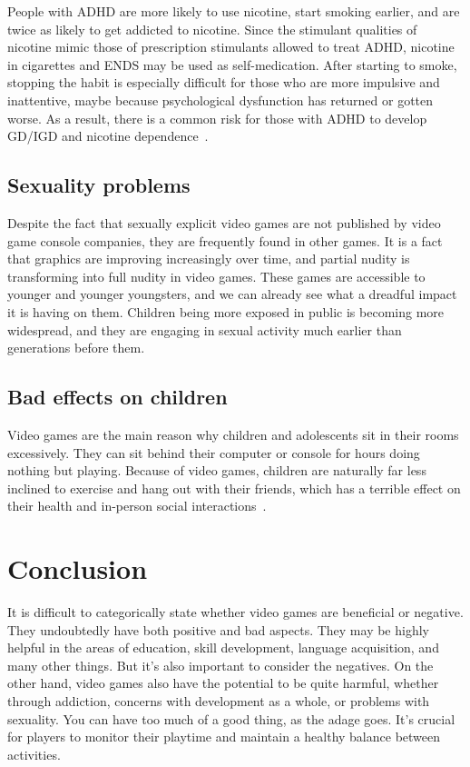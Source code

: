 \documentclass[10pt,twoside,english,a4paper]{article}
\begin{document}
People with ADHD are more likely to use nicotine, start smoking earlier, and are twice as likely to get addicted to nicotine. Since the stimulant qualities of nicotine mimic those of prescription stimulants allowed to treat ADHD, nicotine in cigarettes and ENDS may be used as self-medication. After starting to smoke, stopping the habit is especially difficult for those who are more impulsive and inattentive, maybe because psychological dysfunction has returned or gotten worse. As a result, there is a common risk for those with ADHD to develop GD/IGD and nicotine dependence~\cite{disorder}.

\subsection{Sexuality problems} \label{sexuality}
Despite the fact that sexually explicit video games are not published by video game console companies, they are frequently found in other games. It is a fact that graphics are improving increasingly over time, and partial nudity is transforming into full nudity in video games. These games are accessible to younger and younger youngsters, and we can already see what a dreadful impact it is having on them. Children being more exposed in public is becoming more widespread, and they are engaging in sexual activity much earlier than generations before them.

\subsection{Bad effects on children} \label{children}
Video games are the main reason why children and adolescents sit in their rooms excessively. They can sit behind their computer or console for hours doing nothing but playing. Because of video games, children are naturally far less inclined to exercise and hang out with their friends, which has a terrible effect on their health and in-person social interactions~\cite{problems}.

\section{Conclusion} \label{conclusion}
It is difficult to categorically state whether video games are beneficial or negative. They undoubtedly have both positive and bad aspects. They may be highly helpful in the areas of education, skill development, language acquisition, and many other things. But it's also important to consider the negatives. On the other hand, video games also have the potential to be quite harmful, whether through addiction, concerns with development as a whole, or problems with sexuality. You can have too much of a good thing, as the adage goes. It's crucial for players to monitor their playtime and maintain a healthy balance between activities.
\end{document}

